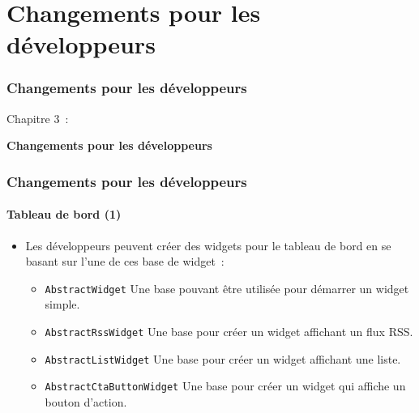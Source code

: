%

\section{Changements pour les développeurs}
\begin{frame}[fragile]
	\frametitle{Changements pour les développeurs}

	\begin{center}\huge{Chapitre 3~:}\end{center}
	\begin{center}\huge{\color{typo3darkgrey}\textbf{Changements pour les développeurs}}\end{center}

\end{frame}


\begin{frame}[fragile]
	\frametitle{Changements pour les développeurs}
	\framesubtitle{Tableau de bord (1)}

	\lstset{basicstyle=\smaller\ttfamily}

	\begin{itemize}
		\item Les développeurs peuvent créer des widgets pour le tableau de
			bord en se basant sur l'une de ces base de widget~:

			\begin{itemize}
				\item \texttt{AbstractWidget}\newline
					\small
						Une base pouvant être utilisée pour démarrer un widget simple.
					\normalsize
				\item \texttt{AbstractRssWidget}\newline
					\small
						Une base pour créer un widget affichant un flux RSS.
					\normalsize
				\item \texttt{AbstractListWidget}\newline
					\small
						Une base pour créer un widget affichant une liste.
					\normalsize
				\item \texttt{AbstractCtaButtonWidget}\newline
					\small
						Une base pour créer un widget qui affiche un bouton d'action.
					\normalsize
			\end{itemize}

	\end{itemize}

\end{frame}

